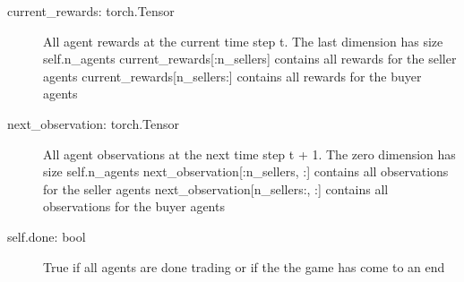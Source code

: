 \documentclass[letterpaper,10pt,english]{sphinxmanual}
\begin{document}
\begin{fulllineitems}
\begin{fulllineitems}
\begin{description}
\item[{current\_rewards: torch.Tensor}] \leavevmode
\sphinxAtStartPar
All agent rewards at the current time step t. The last dimension has size self.n\_agents
current\_rewards{[}:n\_sellers{]} contains all rewards for the seller agents
current\_rewards{[}n\_sellers:{]} contains all rewards for the buyer agents

\item[{next\_observation: torch.Tensor}] \leavevmode
\sphinxAtStartPar
All agent observations at the next time step t + 1. The zero dimension has size self.n\_agents
next\_observation{[}:n\_sellers, :{]} contains all observations for the seller agents
next\_observation{[}n\_sellers:, :{]} contains all observations for the buyer agents

\item[{self.done: bool}] \leavevmode
\sphinxAtStartPar
True if all agents are done trading or if the the game has come to an end

\end{description}

\end{fulllineitems}


\begin{fulllineitems}
\label{\detokenize{MultiAgentMarketRL:environment.MultiAgentEnvironment.store_observations}}
\end{fulllineitems}


\end{fulllineitems}


\begin{fulllineitems}
\label{\detokenize{MultiAgentMarketRL:environment.generate_agents}}
\end{fulllineitems}

\end{document}
